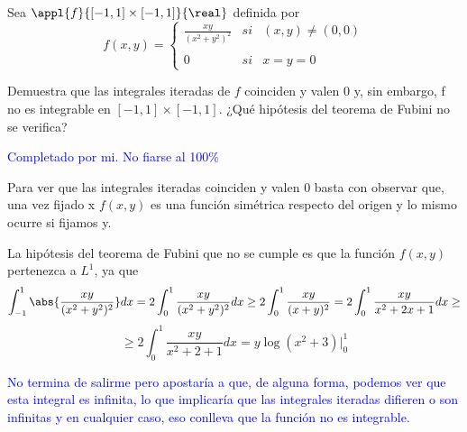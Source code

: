\begin{problem}[4]
Sea $\appl{f}{[-1,1]\times [-1,1]}{\real}$ definida por
\[f(x,y)= \left\{ \begin{array}{lcc}
             \frac{xy}{(x^2+y^2)^2} &  si & (x,y)\neq (0,0) \\
             \\ 0 &  si & x=y=0
             \end{array}
   \right.\]

Demuestra que las integrales iteradas de $f$ coinciden y valen 0 y, sin embargo, f no es integrable en $[-1,1]\times [-1,1]$. ¿Qué hipótesis del teorema de Fubini no se verifica?

\solution
\textcolor{blue}{Completado por mi. No fiarse al 100\%}

Para ver que las integrales iteradas coinciden y valen 0 basta con observar que, una vez fijado x $f(x,y)$ es una función simétrica respecto del origen y lo mismo ocurre si fijamos y.

La hipótesis del teorema de Fubini que no se cumple es que la función $f(x,y)$ pertenezca a $L^1$, ya que
\[\int_{-1}^{1}\abs{\frac{xy}{(x^2+y^2)^2}} dx= 2 \int_0^1\frac{xy}{(x^2+y^2)^2} dx \geq 2 \int_0^1\frac{xy}{(x+y)^2} = 2 \int_0^1\frac{xy}{x^2+2x+1} dx \geq\]
\[\geq 2 \int_0^1\frac{xy}{x^2+2+1} dx = y\log(x^2+3)|_0^1\]

\textcolor{blue}{No termina de salirme pero apostaría a que, de alguna forma, podemos ver que esta integral es infinita, lo que implicaría que las integrales iteradas difieren o son infinitas y en cualquier caso, eso conlleva que la función no es integrable.}
\end{problem}

